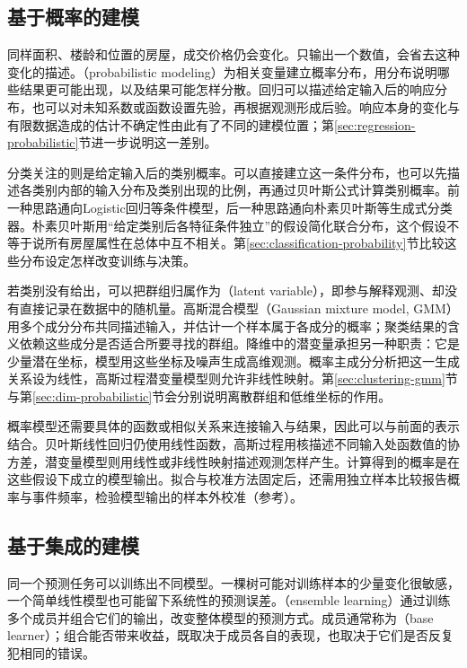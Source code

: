 \subsection{基于概率的建模}
\label{sec:classic-overview-probabilistic}

同样面积、楼龄和位置的房屋，成交价格仍会变化。只输出一个数值，会省去这种变化的描述。（probabilistic modeling）为相关变量建立概率分布，用分布说明哪些结果更可能出现，以及结果可能怎样分散。回归可以描述给定输入后的响应分布，也可以对未知系数或函数设置先验，再根据观测形成后验。响应本身的变化与有限数据造成的估计不确定性由此有了不同的建模位置；第\ref{sec:regression-probabilistic}节进一步说明这一差别。

分类关注的则是给定输入后的类别概率。可以直接建立这一条件分布，也可以先描述各类别内部的输入分布及类别出现的比例，再通过贝叶斯公式计算类别概率。前一种思路通向Logistic回归等条件模型，后一种思路通向朴素贝叶斯等生成式分类器。朴素贝叶斯用“给定类别后各特征条件独立”的假设简化联合分布，这个假设不等于说所有房屋属性在总体中互不相关。第\ref{sec:classification-probability}节比较这些分布设定怎样改变训练与决策。

若类别没有给出，可以把群组归属作为（latent variable），即参与解释观测、却没有直接记录在数据中的随机量。高斯混合模型（Gaussian mixture model, GMM）用多个成分分布共同描述输入，并估计一个样本属于各成分的概率；聚类结果的含义依赖这些成分是否适合所要寻找的群组。降维中的潜变量承担另一种职责：它是少量潜在坐标，模型用这些坐标及噪声生成高维观测。概率主成分分析把这一生成关系设为线性，高斯过程潜变量模型则允许非线性映射。第\ref{sec:clustering-gmm}节与第\ref{sec:dim-probabilistic}节会分别说明离散群组和低维坐标的作用。

概率模型还需要具体的函数或相似关系来连接输入与结果，因此可以与前面的表示结合。贝叶斯线性回归仍使用线性函数，高斯过程用核描述不同输入处函数值的协方差，潜变量模型则用线性或非线性映射描述观测怎样产生。计算得到的概率是在这些假设下成立的模型输出。拟合与校准方法固定后，还需用独立样本比较报告概率与事件频率，检验模型输出的样本外校准（参考）。

\subsection{基于集成的建模}
\label{sec:classic-overview-ensemble}

同一个预测任务可以训练出不同模型。一棵树可能对训练样本的少量变化很敏感，一个简单线性模型也可能留下系统性的预测误差。（ensemble learning）通过训练多个成员并组合它们的输出，改变整体模型的预测方式。成员通常称为（base learner）；组合能否带来收益，既取决于成员各自的表现，也取决于它们是否反复犯相同的错误。

